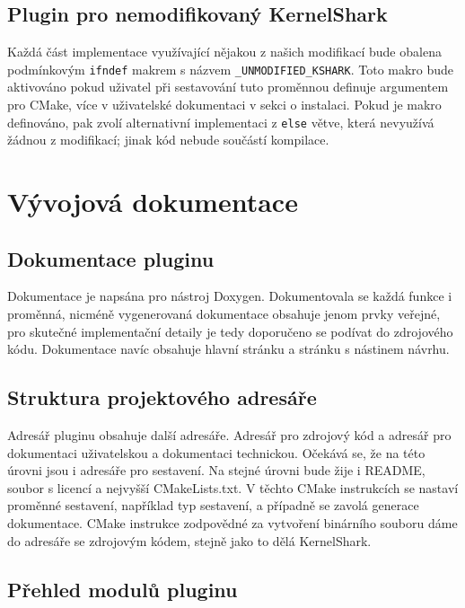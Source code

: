 \subsection*{Plugin pro nemodifikovaný KernelShark}

Každá část implementace využívající nějakou z našich modifikací bude obalena podmínkovým \texttt{ifndef} makrem s názvem \texttt{\_UNMODIFIED\_KSHARK}. Toto makro bude aktivováno pokud uživatel při sestavování tuto proměnnou definuje argumentem pro CMake, více v uživatelské dokumentaci v sekci o instalaci. Pokud je makro definováno, pak zvolí alternativní implementaci z \texttt{else} větve, která nevyužívá žádnou z modifikací; jinak kód nebude součástí kompilace.

\section{Vývojová dokumentace}

\subsection*{Dokumentace pluginu}
Dokumentace je napsána pro nástroj Doxygen. Dokumentovala se každá funkce i proměnná, nicméně vygenerovaná dokumentace obsahuje jenom prvky veřejné, pro skutečné implementační detaily je tedy doporučeno se podívat do zdrojového kódu. Dokumentace navíc obsahuje hlavní stránku a stránku s nástinem návrhu.

\subsection*{Struktura projektového adresáře}

Adresář pluginu obsahuje další adresáře. Adresář  pro zdrojový kód a adresář  pro dokumentaci uživatelskou a dokumentaci technickou. Očekává se, že na této úrovni jsou i adresáře pro sestavení. Na stejné úrovni bude žije i README, soubor s licencí a nejvyšší CMakeLists.txt. V těchto CMake instrukcích se nastaví proměnné sestavení, například typ sestavení, a případně se zavolá generace dokumentace. CMake instrukce zodpovědné za vytvoření binárního souboru dáme do adresáře se zdrojovým kódem, stejně jako to dělá KernelShark.

\subsection*{Přehled modulů pluginu}

